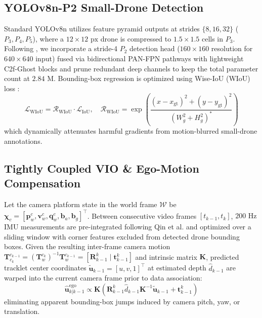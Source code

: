 \documentclass[conference]{IEEEtran}
\begin{document}
\subsection{YOLOv8n-P2 Small-Drone Detection}
Standard YOLOv8n utilizes feature pyramid outputs at strides $\{8, 16, 32\}$ ($P_3, P_4, P_5$), where a $12 \times 12\text{ px}$ drone is compressed to $1.5 \times 1.5$ cells in $P_3$. Following \cite{ref1, ref6}, we incorporate a stride-4 $P_2$ detection head ($160 \times 160$ resolution for $640 \times 640$ input) fused via bidirectional PAN-FPN pathways with lightweight C2f-Ghost blocks \cite{ref8} and prune redundant deep channels to keep the total parameter count at $2.84\text{ M}$. Bounding-box regression is optimized using Wise-IoU (WIoU) loss \cite{ref1}:
\begin{equation}
\mathcal{L}_{\text{WIoU}} = \mathcal{R}_{\text{WIoU}} \cdot \mathcal{L}_{\text{IoU}}, \quad \mathcal{R}_{\text{WIoU}} = \exp\left(\frac{(x - x_{\text{gt}})^2 + (y - y_{\text{gt}})^2}{(W_g^2 + H_g^2)^*}\right)
\label{eq:wiou}
\end{equation}
which dynamically attenuates harmful gradients from motion-blurred small-drone annotations.

\subsection{Tightly Coupled VIO \& Ego-Motion Compensation}
Let the camera platform state in the world frame $\mathcal{W}$ be $\boldsymbol{\chi}_c = [\mathbf{p}_w^c, \mathbf{v}_w^c, \mathbf{q}_w^c, \mathbf{b}_a, \mathbf{b}_g]^\top$. Between consecutive video frames $[t_{k-1}, t_k]$, $200\text{ Hz}$ IMU measurements are pre-integrated following Qin et al. \cite{ref12} and optimized over a sliding window with corner features excluded from detected drone bounding boxes. Given the resulting inter-frame camera motion $\mathbf{T}_{c_k}^{c_{k-1}} = (\mathbf{T}_w^{c_k})^{-1}\mathbf{T}_w^{c_{k-1}} = [\mathbf{R}_{k-1}^k \mid \mathbf{t}_{k-1}^k]$ and intrinsic matrix $\mathbf{K}$, predicted tracklet center coordinates $\tilde{\mathbf{u}}_{k-1} = [u, v, 1]^\top$ at estimated depth $\hat{d}_{k-1}$ are warped into the current camera frame prior to data association:
\begin{equation}
\hat{\mathbf{u}}_{k|k-1}^{\text{ego}} \propto \mathbf{K}\left(\mathbf{R}_{k-1}^k \hat{d}_{k-1}\mathbf{K}^{-1}\tilde{\mathbf{u}}_{k-1} + \mathbf{t}_{k-1}^k\right)
\label{eq:ego_warp}
\end{equation}
eliminating apparent bounding-box jumps induced by camera pitch, yaw, or translation.
\end{document}
